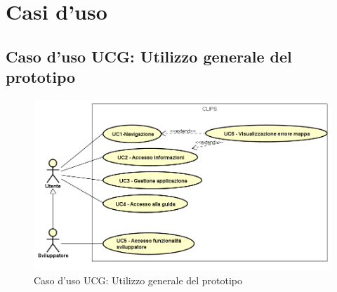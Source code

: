 \documentclass[../AnalisiDeiRequisiti.tex]{subfiles}
\begin{document}
\section{Casi d'uso}
	\hypertarget{UCG}{}
\subsection{Caso d'uso UCG: Utilizzo generale del prototipo}

        \begin{figure}[!h]
            \centering
            \includegraphics[scale=0.95, width=\textwidth]{img/UCG.png}
            \caption{Caso d'uso UCG: Utilizzo generale del prototipo}\label{fig:UCG} 
        \end{figure}
\end{document}
